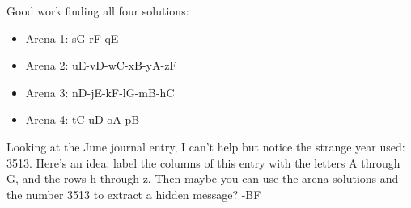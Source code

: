 Good work finding all four solutions:

\begin{itemize}
\item Arena 1: sG-rF-qE
\item Arena 2: uE-vD-wC-xB-yA-zF
\item Arena 3: nD-jE-kF-lG-mB-hC
\item Arena 4: tC-uD-oA-pB
\end{itemize}

Looking at the June journal entry, I can't help but notice
the strange year used: 3513. 
Here's an idea: label the columns of this entry
with the letters A through G, and the rows h through z. Then
maybe you can use the arena solutions and the number 3513
to extract a hidden message? -BF
